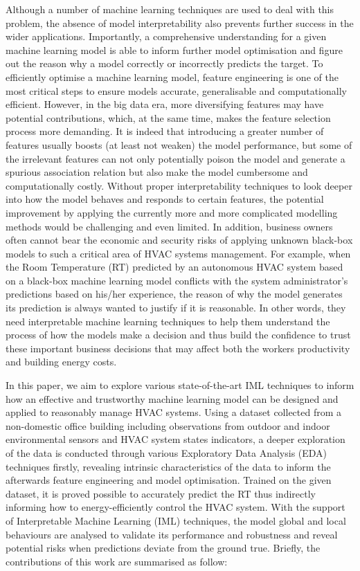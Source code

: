 \documentclass[11pt]{article}
\begin{document}
Although a number of machine learning techniques are used to deal with this problem, the absence of model interpretability also prevents further success in the wider applications. Importantly, a comprehensive understanding for a given machine learning model is able to inform further model optimisation and figure out the reason why a model correctly or incorrectly predicts the target. To efficiently optimise a machine learning model, feature engineering is one of the most critical steps to ensure models accurate, generalisable and computationally efficient. However, in the big data era, more diversifying features may have potential contributions, which, at the same time, makes the feature selection process more demanding. It is indeed that introducing a greater number of features usually boosts (at least not weaken) the model performance, but some of the irrelevant features can not only potentially poison the model and generate a spurious association relation but also make the model cumbersome and computationally costly. Without proper interpretability techniques to look deeper into how the model behaves and responds to certain features, the potential improvement by applying the currently more and more complicated modelling methods would be challenging and even limited. In addition, business owners often cannot bear the economic and security risks of applying unknown black-box models to such a critical area of HVAC systems management. For example, when the Room Temperature (RT) predicted by an autonomous HVAC system based on a black-box machine learning model conflicts with the system administrator’s predictions based on his/her experience, the reason of why the model generates its prediction is always wanted to justify if it is reasonable. In other words, they need interpretable machine learning techniques to help them understand the process of how the models make a decision and thus build the confidence to trust these important business decisions that may affect both the workers productivity and building energy costs.

In this paper, we aim to explore various state-of-the-art IML techniques to inform how an effective and trustworthy machine learning model can be designed and applied to reasonably manage HVAC systems. Using a dataset collected from a non-domestic office building including observations from outdoor and indoor environmental sensors and HVAC system states indicators, a deeper exploration of the data is conducted through various Exploratory Data Analysis (EDA) techniques firstly, revealing intrinsic characteristics of the data to inform the afterwards feature engineering and model optimisation. Trained on the given dataset, it is proved possible to accurately predict the RT thus indirectly informing how to energy-efficiently control the HVAC system. With the support of Interpretable Machine Learning (IML) techniques, the model global and local behaviours are analysed to validate its performance and robustness and reveal potential risks when predictions deviate from the ground true. Briefly, the contributions of this work are summarised as follow:
\end{document}
